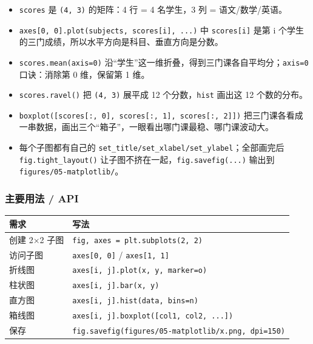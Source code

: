 \begin{itemize}
\tightlist
\item
  \texttt{scores} 是 \texttt{(4,\ 3)} 的矩阵：4 行 = 4 名学生，3 列 =
  语文/数学/英语。
\item
  \texttt{axes{[}0,\ 0{]}.plot(subjects,\ scores{[}i{]},\ ...)} 中
  \texttt{scores{[}i{]}} 是第 i
  个学生的三门成绩，所以水平方向是科目、垂直方向是分数。
\item
  \texttt{scores.mean(axis=0)}
  沿``学生''这一维折叠，得到三门课各自平均分；\texttt{axis=0}
  口诀：消除第 0 维，保留第 1 维。
\item
  \texttt{scores.ravel()} 把 \texttt{(4,\ 3)} 展平成 12
  个分数，\texttt{hist} 画出这 12 个数的分布。
\item
  \texttt{boxplot({[}scores{[}:,\ 0{]},\ scores{[}:,\ 1{]},\ scores{[}:,\ 2{]}{]})}
  把三门课各看成一串数据，画出三个``箱子''，一眼看出哪门课最稳、哪门课波动大。
\item
  每个子图都有自己的
  \texttt{set\_title/set\_xlabel/set\_ylabel}；全部画完后
  \texttt{fig.tight\_layout()}
  让子图不挤在一起，\texttt{fig.savefig(...)} 输出到
  \texttt{figures/05-matplotlib/}。
\end{itemize}

\subsubsection{主要用法 / API}\label{ux4e3bux8981ux7528ux6cd5-api-21}

{\def\LTcaptype{none} %
\begin{longtable}[]{@{}ll@{}}
\toprule\noalign{}
需求 & 写法 \\
\midrule\noalign{}
\endhead
\bottomrule\noalign{}
\endlastfoot
创建 2×2 子图 & \texttt{fig,\ axes\ =\ plt.subplots(2,\ 2)} \\
访问子图 & \texttt{axes{[}0,\ 0{]}} / \texttt{axes{[}1,\ 1{]}} \\
折线图 &
\texttt{axes{[}i,\ j{]}.plot(x,\ y,\ marker=\textquotesingle{}o\textquotesingle{})} \\
柱状图 & \texttt{axes{[}i,\ j{]}.bar(x,\ y)} \\
直方图 & \texttt{axes{[}i,\ j{]}.hist(data,\ bins=n)} \\
箱线图 & \texttt{axes{[}i,\ j{]}.boxplot({[}col1,\ col2,\ ...{]})} \\
保存 &
\texttt{fig.savefig(\textquotesingle{}figures/05-matplotlib/x.png\textquotesingle{},\ dpi=150)} \\
\end{longtable}
}

